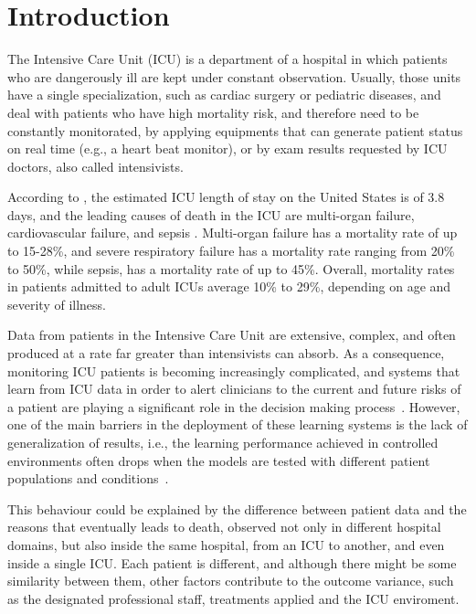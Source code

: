 \chapter{Introduction}
\label{chap:introducao}


The Intensive Care Unit (ICU) is a department of a hospital in which patients who are dangerously ill are kept under constant observation. Usually, those units have a single specialization, such as cardiac surgery or pediatric diseases, and deal with patients who have high mortality risk, and therefore need to be constantly monitorated, by applying equipments that can generate patient status on real time (e.g., a heart beat monitor), or by exam results requested by ICU doctors, also called intensivists.

According to \citet{gruenberg2006factors}, the estimated ICU length of stay on the United States is of 3.8 days, and the leading causes of death in the ICU are multi-organ failure, cardiovascular failure, and sepsis \cite{wunsch2010three}. Multi-organ failure has a mortality rate of up to 15-28\%, and severe respiratory failure has a mortality rate ranging from 20\% to 50\%, while sepsis, has a mortality rate of up to 45\%. Overall, mortality rates in patients admitted to adult ICUs average 10\% to 29\%, depending on age and severity of illness.

Data from patients in the Intensive Care Unit are extensive, complex, and often produced at a rate far greater than intensivists can absorb. As a consequence, monitoring ICU patients is becoming increasingly complicated, and systems that learn from ICU data in order to alert clinicians to the current and future risks of a patient are playing a significant role in the decision making process~\citep{mcneill}. However, one of the main barriers in the deployment of these learning systems is the lack of generalization of results, i.e., the learning performance achieved in controlled environments often drops when the models are tested with different patient populations and conditions~\citep{lifetime,longi}. 

This behaviour could be explained by the difference between patient data and the reasons that eventually leads to death, observed not only in different hospital domains, but also inside the same hospital, from an ICU to another, and even inside a single ICU. Each patient is different, and although there might be some similarity between them, other factors contribute to the outcome variance, such as the designated professional staff, treatments applied and the ICU enviroment.

